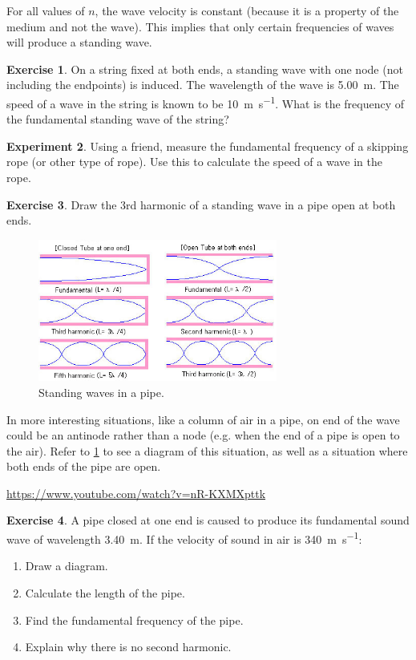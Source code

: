 \documentclass[a4paper]{amsbook}
\newcommand{\goandwatch}[1]{
\begin{center}
\begin{tcolorbox}[width=0.8\textwidth,colback={SkyBlue!20},title={\textbf{Go and watch...}},colbacktitle=MidnightBlue,coltitle=White]
  \textcolor{MidnightBlue}{\url{#1}}
\end{tcolorbox}
\end{center}}
\theoremstyle{definition}
\newtheorem{exercise}{Exercise}
\numberwithin{exercise}{chapter}
\numberwithin{exercise}{chapter}
\newtheorem{experiment}[exercise]{Experiment}
\begin{document}
For all values of $ n $, the wave velocity is constant (because it is a property of the medium and not the wave). This implies that only certain
frequencies of waves will produce a standing wave.

\begin{exercise}
  On a string fixed at both ends, a standing wave with one node (not including the endpoints) is induced. The wavelength of
  the wave is \SI{5.00}{\metre}. The speed of a wave in the string is known to be \SI{10}{\metre\per\second}. What is the frequency of the
  fundamental standing wave of the string?
\end{exercise}

\begin{experiment}
  Using a friend, measure the fundamental frequency of a skipping rope (or other type of rope). Use this to calculate the speed
  of a wave in the rope.
\end{experiment}

\begin{exercise}
  Draw the 3rd harmonic of a standing wave in a pipe open at both ends.
\end{exercise}

\begin{figure}
  \centering
  \includegraphics[width=0.7\textwidth]{standingwave2}
  \caption{Standing waves in a pipe.}\label{fig:openpipe}
\end{figure}

In more interesting situations, like a column of air in a pipe, on end of the wave could be an antinode rather than a node (e.g. when the end of
a pipe is open to the air). Refer to \cref{fig:openpipe} to see a diagram of this situation, as well as a situation where both ends of the pipe
are open.

\goandwatch{https://www.youtube.com/watch?v=nR-KXMXpttk}

\begin{exercise}
  A pipe closed at one end is caused to produce its fundamental sound wave of wavelength \SI{3.40}{\metre}. If the velocity of
  sound in air is \SI{340}{\metre\per\second}:
  \begin{enumerate}
    \item Draw a diagram.
    \item Calculate the length of the pipe.
    \item Find the fundamental frequency of the pipe.
    \item Explain why there is no second harmonic.
  \end{enumerate}
\end{exercise}
\end{document}
